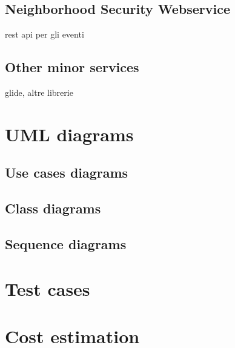 \documentclass[a4paper]{scrreprt}
\begin{document}
\section{Neighborhood Security Webservice}
rest api per gli  eventi

\section{Other minor services}
glide, altre librerie


\chapter{UML diagrams}

\section{Use cases diagrams}

\section{Class diagrams}

\section{Sequence diagrams}


\chapter{Test cases}


\chapter{Cost estimation}



%
%
\end{document}
